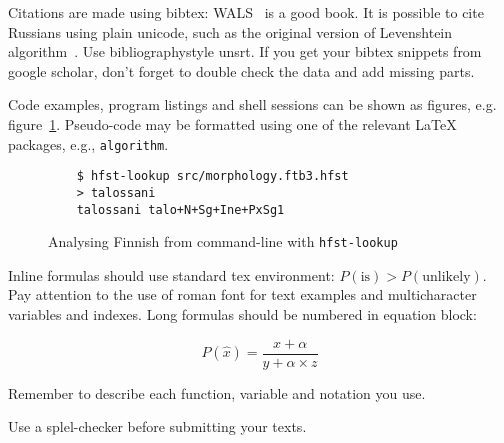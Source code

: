 \documentclass[b5paper,notitlepage]{article}
\newif\ifcameraready
\begin{document}
Citations are made using bibtex: WALS~\cite{haspelmath2005world} is a good book.
It is possible to cite Russians using plain unicode, such as the original
version of Levenshtein algorithm~\cite{levenshtein1965}.
Use bibliographystyle unsrt. If you get your bibtex snippets from google
scholar, don't forget to double check the data and add missing parts.

Code examples, program listings and shell sessions can be shown as figures,
e.g. figure~\ref{code:analysis}.
Pseudo-code may be formatted using one of the relevant \LaTeX{} packages, e.g.,
\texttt{algorithm}.

\begin{figure}
    \center
    \begin{verbatim}
    $ hfst-lookup src/morphology.ftb3.hfst
    > talossani
    talossani talo+N+Sg+Ine+PxSg1
    \end{verbatim}
    \caption{Analysing Finnish from command-line with \texttt{hfst-lookup}
    \label{code:analysis}}
\end{figure}

Inline formulas should use standard tex environment: $P(\mathrm{is}) >
P(\mathrm{unlikely})$. Pay attention to the use of roman font for text examples
and multicharacter variables and indexes. Long formulas should be numbered in
equation block:

\begin{equation}
    P(\hat x) = \frac{x+\alpha}{y+\alpha\times z}
\end{equation}

Remember to describe each function, variable and notation you use.

Use a splel-checker before submitting your texts.

\ifcameraready
\section*{Acknowledgments}

Acknowledgments should be un-numbered last section. Do not include
acknowledgements in anonymised review version.
\fi



\end{document}
